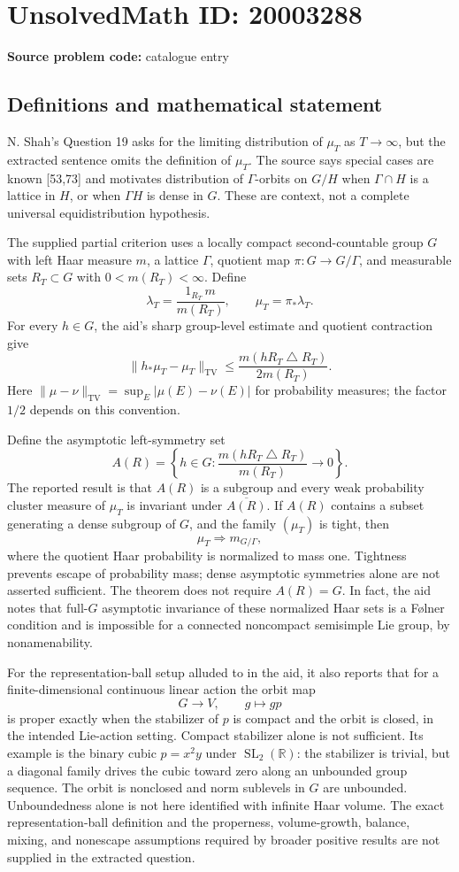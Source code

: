 \documentclass[11pt]{article}
\newcommand{\R}{\mathbb{R}}
\begin{document}
\section*{UnsolvedMath ID: 20003288}
\textbf{Source problem code:} catalogue entry
\subsection{Definitions and mathematical statement}
N. Shah's Question 19 asks for the limiting distribution of \(\mu_T\) as \(T\to\infty\), but the extracted sentence omits the definition of \(\mu_T\). The source says special cases are known [53,73] and motivates distribution of \(\Gamma\)-orbits on \(G/H\) when \(\Gamma\cap H\) is a lattice in \(H\), or when \(\Gamma H\) is dense in \(G\). These are context, not a complete universal equidistribution hypothesis.

The supplied partial criterion uses a locally compact second-countable group \(G\) with left Haar measure \(m\), a lattice \(\Gamma\), quotient map \(\pi:G\to G/\Gamma\), and measurable sets \(R_T\subset G\) with \(0<m(R_T)<\infty\). Define
\[
 \lambda_T=\frac{1_{R_T}\,m}{m(R_T)},\qquad\mu_T=\pi_*\lambda_T.
\]
For every \(h\in G\), the aid's sharp group-level estimate and quotient contraction give
\[
 \|h_*\mu_T-\mu_T\|_{\mathrm{TV}}
 \leq\frac{m(hR_T\mathbin{\triangle}R_T)}{2m(R_T)}.
\]
Here \(\|\mu-\nu\|_{\mathrm{TV}}=\sup_E|\mu(E)-\nu(E)|\) for probability measures; the factor \(1/2\) depends on this convention.

Define the asymptotic left-symmetry set
\[
 A(R)=\left\{h\in G:\frac{m(hR_T\mathbin{\triangle}R_T)}{m(R_T)}\longrightarrow0\right\}.
\]
The reported result is that \(A(R)\) is a subgroup and every weak probability cluster measure of \(\mu_T\) is invariant under \(\overline{A(R)}\). If \(A(R)\) contains a subset generating a dense subgroup of \(G\), and the family \((\mu_T)\) is tight, then
\[
 \mu_T\Longrightarrow m_{G/\Gamma},
\]
where the quotient Haar probability is normalized to mass one. Tightness prevents escape of probability mass; dense asymptotic symmetries alone are not asserted sufficient. The theorem does not require \(A(R)=G\). In fact, the aid notes that full-\(G\) asymptotic invariance of these normalized Haar sets is a F\o lner condition and is impossible for a connected noncompact semisimple Lie group, by nonamenability.

For the representation-ball setup alluded to in the aid, it also reports that for a finite-dimensional continuous linear action the orbit map
\[
 G\longrightarrow V,\qquad g\longmapsto gp
\]
is proper exactly when the stabilizer of \(p\) is compact and the orbit is closed, in the intended Lie-action setting. Compact stabilizer alone is not sufficient. Its example is the binary cubic \(p=x^2y\) under \(\operatorname{SL}_2(\R)\): the stabilizer is trivial, but a diagonal family drives the cubic toward zero along an unbounded group sequence. The orbit is nonclosed and norm sublevels in \(G\) are unbounded. Unboundedness alone is not here identified with infinite Haar volume. The exact representation-ball definition and the properness, volume-growth, balance, mixing, and nonescape assumptions required by broader positive results are not supplied in the extracted question.
\end{document}
